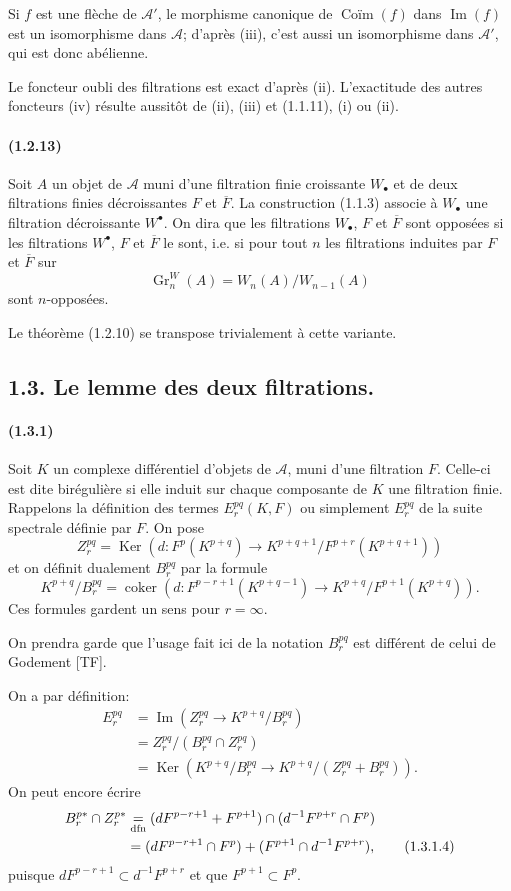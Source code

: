 \documentclass[10pt]{article}
\newcommand{\Gr}{\operatorname{Gr}}
\newcommand{\Ker}{\operatorname{Ker}}
\newcommand{\Imop}{\operatorname{Im}}
\newcommand{\coker}{\operatorname{coker}}
\newcommand{\fg}{\guillemotright}
\newcommand{\og}{\guillemotleft}
\newcommand{\calA}{\mathcal A}
\begin{document}
Si $f$ est une flèche de $\calA'$, le morphisme canonique de $\operatorname{Coïm}(f)$ dans $\Imop(f)$ est un isomorphisme dans $\calA$; d'après (iii), c'est aussi un isomorphisme dans $\calA'$, qui est donc abélienne.

Le foncteur \og oubli des filtrations\fg{} est exact d'après (ii). L'exactitude des autres foncteurs (iv) résulte aussitôt de (ii), (iii) et (1.1.11), (i) ou (ii).

\paragraph{(1.2.13)} Soit $A$ un objet de $\calA$ muni d'une filtration finie croissante $W_\bullet$ et de deux filtrations finies décroissantes $F$ et $\overline F$. La construction (1.1.3) associe à $W_\bullet$ une filtration décroissante $W^\bullet$. On dira que les filtrations $W_\bullet$, $F$ et $\overline F$ sont opposées si les filtrations $W^\bullet$, $F$ et $\overline F$ le sont, i.e. si pour tout $n$ les filtrations induites par $F$ et $\overline F$ sur
\[
\Gr_n^W(A)=W_n(A)/W_{n-1}(A)
\]
sont $n$-opposées.

Le théorème (1.2.10) se transpose trivialement à cette variante.

\subsection*{1.3. Le lemme des deux filtrations.}

\paragraph{(1.3.1)} Soit $K$ un complexe différentiel d'objets de $\calA$, muni d'une filtration $F$. Celle-ci est dite birégulière si elle induit sur chaque composante de $K$ une filtration finie. Rappelons la définition des termes $E_r^{pq}(K,F)$ ou simplement $E_r^{pq}$ de la suite spectrale définie par $F$. On pose
\[
Z_r^{pq}=\Ker\left(d:F^p(K^{p+q})\to K^{p+q+1}/F^{p+r}(K^{p+q+1})\right)
\]
et on définit dualement $B_r^{pq}$ par la formule
\[
K^{p+q}/B_r^{pq}=\coker\left(d:F^{p-r+1}(K^{p+q-1})\to K^{p+q}/F^{p+1}(K^{p+q})\right).
\]
Ces formules gardent un sens pour $r=\infty$.

On prendra garde que l'usage fait ici de la notation $B_r^{pq}$ est différent de celui de Godement [TF].

On a par définition:
\begin{align}
E_r^{pq}&=\Imop\left(Z_r^{pq}\to K^{p+q}/B_r^{pq}\right) \tag{1.3.1.1}\\
&=Z_r^{pq}/(B_r^{pq}\cap Z_r^{pq}) \tag{1.3.1.2}\\
&=\Ker\left(K^{p+q}/B_r^{pq}\to K^{p+q}/(Z_r^{pq}+B_r^{pq})\right). \tag{1.3.1.3}
\end{align}
On peut encore écrire
\begin{align}
B_r^{p*}\cap Z_r^{p*}
&\underset{\mathrm{dfn}}{=}(dF^{p-r+1}+F^{p+1})\cap(d^{-1}F^{p+r}\cap F^p) \notag\\
&=(dF^{p-r+1}\cap F^p)+(F^{p+1}\cap d^{-1}F^{p+r}), \tag{1.3.1.4}
\end{align}
puisque $dF^{p-r+1}\subset d^{-1}F^{p+r}$ et que $F^{p+1}\subset F^p$.
\end{document}

